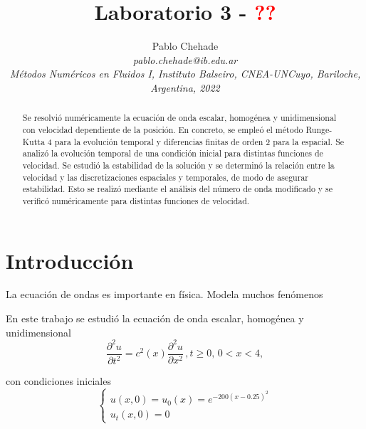\documentclass[aps,prb,twocolumn,superscriptaddress,floatfix,longbibliography,10pt]{revtex4-2}
\newcounter{para}
\begin{document}
\newcommand{\mytitle}{Laboratorio 3 - \textcolor{red}{??}}

\title{\mytitle}

\author{Pablo Chehade \\
    \small \textit{pablo.chehade@ib.edu.ar} \\
    \small \textit{Métodos Numéricos en Fluidos I, Instituto Balseiro, CNEA-UNCuyo, Bariloche, Argentina, 2022} \\}


\begin{abstract}

Se resolvió numéricamente la ecuación de onda escalar, homogénea y unidimensional con velocidad dependiente de la posición. En concreto, se empleó el método Runge-Kutta 4 para la evolución temporal y diferencias finitas de orden 2 para la espacial. Se analizó la evolución temporal de una condición inicial para distintas funciones de velocidad. Se estudió la estabilidad de la solución y se determinó la relación entre la velocidad y las discretizaciones espaciales y temporales, de modo de asegurar estabilidad. Esto se realizó mediante el análisis del número de onda modificado y se verificó numéricamente para distintas funciones de velocidad.

\end{abstract}

\maketitle

\section{Introducción}

La ecuación de ondas es importante en física. Modela muchos fenómenos


En este trabajo se estudió la ecuación de onda escalar, homogénea y unidimensional
\begin{equation}
  \frac{\partial^2 u}{\partial t^2} = c^2(x)\frac{\partial^2 u}{\partial x^2} \,, t \geq 0, \,  0 < x < 4,
  \label{eq:ecuacion_ondas}
\end{equation}


con condiciones iniciales
\begin{equation}

  \left\{\begin{matrix}
    u(x,0) = u_0(x) = e^{-200 (x-0.25)^2} \\
    u_t(x,0) = 0
   \end{matrix}\right.

 
  \label{eq:condiciones_iniciales}
\end{equation}
\end{document}
